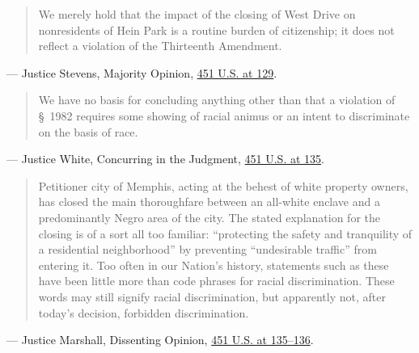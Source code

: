 \documentclass[12pt]{article}
\begin{document}
\begin{quote}
We merely hold that the impact of the closing of West Drive on nonresidents of Hein Park is a routine burden of citizenship; it does not reflect a violation of the Thirteenth Amendment.
\end{quote}
\noindent --- Justice Stevens, Majority Opinion, \href{https://supreme.justia.com/cases/federal/us/451/100/}{451 U.S. at 129}.

\begin{quote}
We have no basis for concluding anything other than that a violation of \S~1982 requires some showing of racial animus or an intent to discriminate on the basis of race.
\end{quote}
\noindent --- Justice White, Concurring in the Judgment, \href{https://supreme.justia.com/cases/federal/us/451/100/}{451 U.S. at 135}.

\begin{quote}
Petitioner city of Memphis, acting at the behest of white property owners, has closed the main thoroughfare between an all-white enclave and a predominantly Negro area of the city. The stated explanation for the closing is of a sort all too familiar: ``protecting the safety and tranquility of a residential neighborhood'' by preventing ``undesirable traffic'' from entering it. Too often in our Nation's history, statements such as these have been little more than code phrases for racial discrimination. These words may still signify racial discrimination, but apparently not, after today's decision, forbidden discrimination.
\end{quote}
\noindent --- Justice Marshall, Dissenting Opinion, \href{https://supreme.justia.com/cases/federal/us/451/100/}{451 U.S. at 135--136}.
\end{document}
